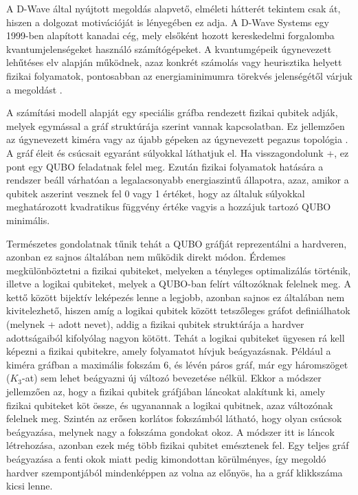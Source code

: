 A D-Wave által nyújtott megoldás alapvető, elméleti hátterét tekintem csak át, hiszen a dolgozat motivációját is lényegében ez adja. A D-Wave Systems egy 1999-ben alapított kanadai cég, mely elsőként hozott kereskedelmi forgalomba kvantumjelenségeket használó számítógépeket. A kvantumgépeik úgynevezett lehűtéses elv alapján működnek, azaz konkrét számolás vagy heurisztika helyett fizikai folyamatok, pontosabban az energiaminimumra törekvés jelenségétől várjuk a megoldást \cite{Szabo}. 

A számítási modell alapját egy speciális gráfba rendezett fizikai qubitek adják, melyek  egymással a gráf struktúrája szerint vannak kapcsolatban. Ez jellemzően az úgynevezett kiméra vagy az újabb gépeken az úgynevezett pegazus topológia \cite{Chimera, Pegasus}. A gráf éleit és csúcsait egyaránt súlyokkal láthatjuk el. Ha visszagondolunk \az+, ez pont egy QUBO feladatnak felel meg. Ezután fizikai folyamatok hatására a rendszer beáll várhatóan a legalacsonyabb energiaszintű állapotra, azaz, amikor a qubitek aszerint vesznek fel 0 vagy 1 értéket, hogy az általuk súlyokkal meghatározott kvadratikus függvény értéke vagyis a hozzájuk tartozó QUBO minimális.

Természetes gondolatnak tűnik tehát a QUBO gráfját reprezentálni a hardveren, azonban ez sajnos általában nem működik direkt módon.
Érdemes megkülönböztetni a fizikai qubiteket, melyeken a tényleges optimalizálás történik, illetve a logikai qubiteket, melyek a QUBO-ban felírt változóknak felelnek meg. A kettő között bijektív leképezés lenne a legjobb, azonban sajnos ez általában nem kivitelezhető, hiszen amíg a logikai qubitek között tetszőleges gráfot definiálhatok (melynek \az+ adott nevet), addig a fizikai qubitek struktúrája a hardver adottságaiból kifolyólag nagyon kötött. Tehát a logikai qubiteket ügyesen rá kell képezni a fizikai qubitekre, amely folyamatot hívjuk beágyazásnak.
Például a kiméra gráfban a maximális fokszám 6, és lévén páros gráf, már egy háromszöget ($K_3$-at) sem lehet beágyazni új változó bevezetése nélkül. Ekkor a módszer jellemzően az, hogy a fizikai qubitek gráfjában láncokat alakítunk ki, amely fizikai qubiteket köt össze, és ugyanannak a logikai qubitnek, azaz változónak felelnek meg. Szintén az erősen korlátos fokszámból látható, hogy olyan csúcsok beágyazása, melynek nagy a fokszáma gondokat okoz. A módszer itt is láncok létrehozása, azonban ezek még több fizikai qubitet emésztenek fel. Egy teljes gráf beágyazása a fenti okok miatt pedig kimondottan körülményes, így megoldó hardver szempontjából mindenképpen az volna az előnyös, ha a gráf klikkszáma kicsi lenne.

